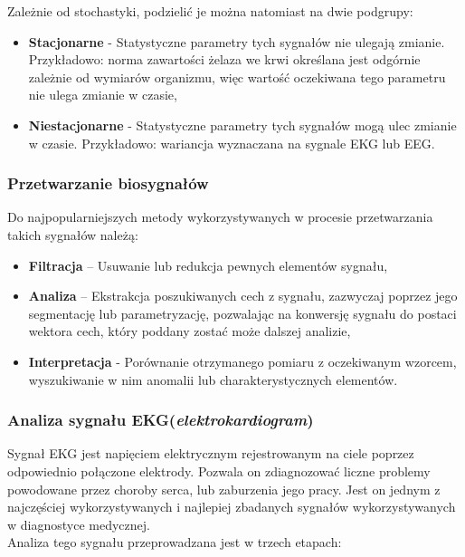 Zależnie od stochastyki, podzielić je można natomiast na dwie podgrupy:

\begin{itemize}
	\item \textbf{Stacjonarne} - Statystyczne parametry tych sygnałów nie ulegają zmianie. Przykładowo: norma zawartości żelaza we krwi określana jest odgórnie zależnie od wymiarów organizmu, więc wartość oczekiwana tego parametru nie ulega zmianie w czasie,
	\item \textbf{Niestacjonarne} - Statystyczne parametry tych sygnałów mogą ulec zmianie w czasie. Przykładowo: wariancja wyznaczana na sygnale EKG lub EEG.
\end{itemize}

\subsubsection{Przetwarzanie biosygnałów}

Do najpopularniejszych metody wykorzystywanych w procesie przetwarzania takich sygnałów należą:

\begin{itemize}
	\item \textbf{Filtracja} – Usuwanie lub redukcja pewnych elementów sygnału,
	\item \textbf{Analiza} – Ekstrakcja poszukiwanych cech z sygnału, zazwyczaj poprzez jego segmentację lub parametryzację, pozwalając na konwersję sygnału do postaci wektora cech, który poddany zostać może dalszej analizie,
	\item \textbf{Interpretacja} - Porównanie otrzymanego pomiaru z oczekiwanym wzorcem, wyszukiwanie w nim anomalii lub charakterystycznych elementów.
\end{itemize}

\subsubsection{Analiza sygnału EKG(\textit{elektrokardiogram})}

Sygnał EKG jest napięciem elektrycznym rejestrowanym na ciele poprzez odpowiednio połączone elektrody. Pozwala on zdiagnozować liczne problemy powodowane przez choroby serca, lub zaburzenia jego pracy. Jest on jednym z najczęściej wykorzystywanych i najlepiej zbadanych sygnałów wykorzystywanych w diagnostyce medycznej. \\

Analiza tego sygnału przeprowadzana jest w trzech etapach:

